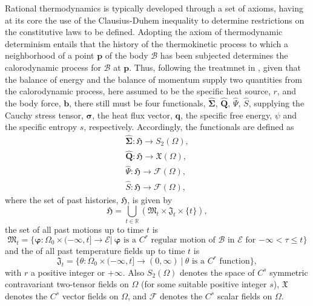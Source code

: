 Rational thermodynamics is typically developed through a set of axioms, having at its core the use of the Clausius-Duhem inequality to determine restrictions on the constitutive laws to be defined.
Adopting the axiom of thermodynamic determinism entails that the history of the thermokinetic process to which a neighborhood of a point $\mathbf p$ of the body $\mathcal B$ has been subjected determines the calorodynamic process for $\mathcal B$ at $\mathbf p$.
Thus, following the treatmnet in \cite{marsden1994mathematical}, given that the balance of energy and the balance of momentum supply two quantities from the calorodynamic process, here assumed to be the specific heat source, $r$, and the body force, $\mathbf b$, there still must be four functionals, $\hat{\bm \Sigma}$, $\hat{\mathbf Q}$, $\hat \Psi$, $\hat S$, supplying the Cauchy stress tensor, $\bm \sigma$, the heat flux vector, $\mathbf q$, the specific free energy, $\psi$ and the specific entropy $s$, respectively.
Accordingly, the functionals are defined as
\begin{gather}
  \label{eq:functional_stress}
  \hat{\bm \Sigma}\colon \mathfrak{H} \to S_2(\Omega), \\
  \label{eq:functional_heat_flux}
  \hat{\mathbf Q}\colon \mathfrak{H} \to \mathfrak{X}(\Omega), \\
  \label{eq:functional_free_energy}
  \hat{\Psi}\colon \mathfrak{H} \to \mathscr{F}(\Omega), \\
  \label{eq:functional_entropy}
  \hat{S}\colon \mathfrak{H} \to \mathscr{F}(\Omega),
\end{gather}
where the set of past histories, $\mathfrak H$, is given by
\begin{equation}
  \mathfrak H =\bigcup_{t\in \mathbb R}(\mathfrak M_t\times \mathfrak J_t \times \{t\}),
\end{equation}
the set of all past motions up to time $t$ is
\begin{equation}
  \mathfrak M_t =\{\bm\varphi\colon \Omega_0 \times(-\infty, t]\to \mathscr E |\ \text{$\bm\varphi$ is a $C^r$ regular motion of $\mathcal B$ in $\mathscr E$ for $-\infty < \tau \leq t$}\}
\end{equation}
and the of all past temperature fields up to time $t$ is
\begin{equation}
  \mathfrak J_t=\{\theta\colon\Omega_0\times (-\infty, t] \to (0, \infty)\ |\ \text{$\theta$ is a $C^r$ function}\},
\end{equation}
with $r$ a positive integer or $+\infty$.
Also $S_2(\Omega)$ denotes the space of $C^s$ symmetric contravariant two-tensor fields on $\Omega$ (for some suitable positive integer $s$), $\mathfrak{X}$ denotes the $C^s$ vector fields on $\Omega$, and $\mathscr F$ denotes the $C^s$ scalar fields on $\Omega$.

